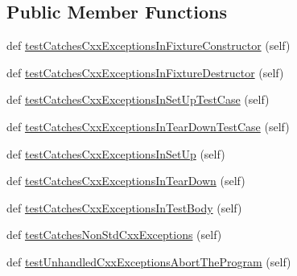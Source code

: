 \subsection*{Public Member Functions}
\begin{DoxyCompactItemize}
\item 
def \mbox{\hyperlink{classgoogletest-master_1_1googletest_1_1test_1_1googletest-catch-exceptions-test_1_1_catch_cxx_exceptions_test_ac548904470fc9ff4bfcc633a7eaed70f}{test\+Catches\+Cxx\+Exceptions\+In\+Fixture\+Constructor}} (self)
\item 
def \mbox{\hyperlink{classgoogletest-master_1_1googletest_1_1test_1_1googletest-catch-exceptions-test_1_1_catch_cxx_exceptions_test_a85162644dab6a3b69ecc833fbe1c498b}{test\+Catches\+Cxx\+Exceptions\+In\+Fixture\+Destructor}} (self)
\item 
def \mbox{\hyperlink{classgoogletest-master_1_1googletest_1_1test_1_1googletest-catch-exceptions-test_1_1_catch_cxx_exceptions_test_abebb08db6cf38744820c75fc1cf4522e}{test\+Catches\+Cxx\+Exceptions\+In\+Set\+Up\+Test\+Case}} (self)
\item 
def \mbox{\hyperlink{classgoogletest-master_1_1googletest_1_1test_1_1googletest-catch-exceptions-test_1_1_catch_cxx_exceptions_test_a3227de9a0dab939a2fc39f6f76fc09b8}{test\+Catches\+Cxx\+Exceptions\+In\+Tear\+Down\+Test\+Case}} (self)
\item 
def \mbox{\hyperlink{classgoogletest-master_1_1googletest_1_1test_1_1googletest-catch-exceptions-test_1_1_catch_cxx_exceptions_test_a09c0b61ca2ae2892d7abd4dd5b8f50d7}{test\+Catches\+Cxx\+Exceptions\+In\+Set\+Up}} (self)
\item 
def \mbox{\hyperlink{classgoogletest-master_1_1googletest_1_1test_1_1googletest-catch-exceptions-test_1_1_catch_cxx_exceptions_test_a3f9b8f382a25ccadcc6aab92c3e89923}{test\+Catches\+Cxx\+Exceptions\+In\+Tear\+Down}} (self)
\item 
def \mbox{\hyperlink{classgoogletest-master_1_1googletest_1_1test_1_1googletest-catch-exceptions-test_1_1_catch_cxx_exceptions_test_a2faa74e1e537c10c75ddfa8b6c2a3c9b}{test\+Catches\+Cxx\+Exceptions\+In\+Test\+Body}} (self)
\item 
def \mbox{\hyperlink{classgoogletest-master_1_1googletest_1_1test_1_1googletest-catch-exceptions-test_1_1_catch_cxx_exceptions_test_a179e410d285c72a34de7fec417fcc867}{test\+Catches\+Non\+Std\+Cxx\+Exceptions}} (self)
\item 
def \mbox{\hyperlink{classgoogletest-master_1_1googletest_1_1test_1_1googletest-catch-exceptions-test_1_1_catch_cxx_exceptions_test_ab6d7996b774c0be213c4803789c628b3}{test\+Unhandled\+Cxx\+Exceptions\+Abort\+The\+Program}} (self)
\end{DoxyCompactItemize}


